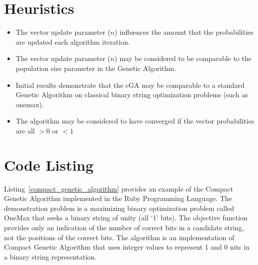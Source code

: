 \documentclass[a4paper, 11pt]{article}
\begin{document}
\section{Heuristics}
\label{sec:heuristics}
\begin{itemize}
	\item The vector update parameter ($n$) influences the amount that the probabilities are updated each algorithm iteration.
	\item The vector update parameter ($n$) may be considered to be comparable to the population size parameter in the Genetic Algorithm.
	\item Initial results demonstrate that the cGA may be comparable to a standard Genetic Algorithm on classical binary string optimization problems (such as onemax).	
	\item The algorithm may be considered to have converged if the vector probabilities are all $>0$ or $<1$
\end{itemize}

\section{Code Listing}
\label{sec:code}
Listing~\ref{compact_genetic_algorithm} provides an example of the Compact Genetic Algorithm implemented in the Ruby Programming Language. 
The demonstration problem is a maximizing binary optimization problem called OneMax that seeks a binary string of unity (all `1' bits). The objective function provides only an indication of the number of correct bits in a candidate string, not the positions of the correct bits.
The algorithm is an implementation of Compact Genetic Algorithm that uses integer values to represent 1 and 0 nits in a binary string representation. 
\end{document}
